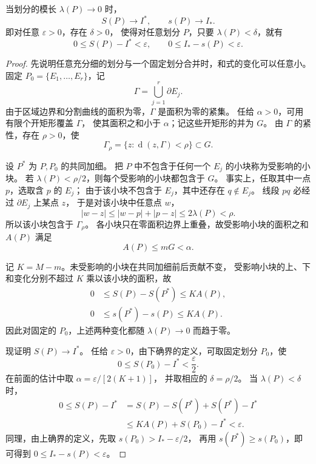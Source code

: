 \begin{proposition}\label{p2-darboux-limit}
当划分的模长 $\lambda(P)\to0$ 时，
\[
S(P)\to I^*,\qquad s(P)\to I_*.
\]
即对任意 $\varepsilon>0$，存在 $\delta>0$，
使得对任意划分 $P$，只要 $\lambda(P)<\delta$，就有
\[
0\le S(P)-I^*<\varepsilon,\qquad
0\le I_*-s(P)<\varepsilon.
\]
\end{proposition}
\begin{proof}
先说明任意充分细的划分与一个固定划分合并时，和式的变化可以任意小。
固定 $P_0=\{E_1,\ldots,E_r\}$，记
\[
\Gamma=\bigcup_{j=1}^r\partial E_j.
\]
由于区域边界和分割曲线的面积为零，$\Gamma$ 是面积为零的紧集。
任给 $\alpha>0$，可用有限个开矩形覆盖 $\Gamma$，
使其面积之和小于 $\alpha$；记这些开矩形的并为 $G$。
由 $\Gamma$ 的紧性，存在 $\rho>0$，使
\[
\Gamma_\rho=\{z:\operatorname{d}(z,\Gamma)<\rho\}\subset G.
\]

设 $P^*$ 为 $P,P_0$ 的共同加细。
把 $P$ 中不包含于任何一个 $E_j$ 的小块称为受影响的小块。
若 $\lambda(P)<\rho/2$，则每个受影响的小块都包含于 $G$。
事实上，任取其中一点 $p$，选取含 $p$ 的 $E_j$；
由于该小块不包含于 $E_j$，其中还存在 $q\notin E_j$。
线段 $pq$ 必经过 $\partial E_j$ 上某点 $z$，
于是对该小块中任意点 $w$，
\[
|w-z|\le |w-p|+|p-z|
\le 2\lambda(P)<\rho.
\]
所以该小块包含于 $\Gamma_\rho$。
各小块只在零面积边界上重叠，故受影响小块的面积之和 $A(P)$ 满足
\[
A(P)\le mG<\alpha.
\]

记 $K=M-m$。未受影响的小块在共同加细前后贡献不变，
受影响小块的上、下和变化分别不超过 $K$ 乘以该小块的面积，故
\[
\begin{aligned}
0&\le S(P)-S(P^*)\le K A(P),\\
0&\le s(P^*)-s(P)\le K A(P).
\end{aligned}
\]
因此对固定的 $P_0$，上述两种变化都随 $\lambda(P)\to0$ 而趋于零。

现证明 $S(P)\to I^*$。
任给 $\varepsilon>0$，由下确界的定义，可取固定划分 $P_0$，使
\[
0\le S(P_0)-I^*<\frac{\varepsilon}{2}.
\]
在前面的估计中取 $\alpha=\varepsilon/[2(K+1)]$，
并取相应的 $\delta=\rho/2$。
当 $\lambda(P)<\delta$ 时，
\[
\begin{aligned}
0\le S(P)-I^*
&=S(P)-S(P^*)+S(P^*)-I^*\\
&\le K A(P)+S(P_0)-I^*
<\varepsilon.
\end{aligned}
\]
同理，由上确界的定义，先取 $s(P_0)>I_*-\varepsilon/2$，
再用 $s(P^*)\ge s(P_0)$，即可得到 $0\le I_*-s(P)<\varepsilon$。
\end{proof}

